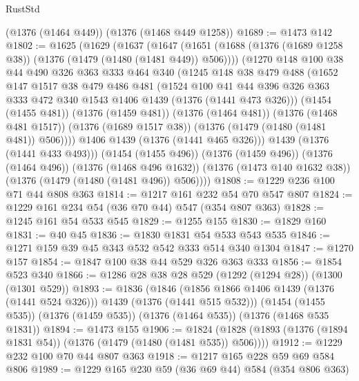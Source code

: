 \begin{lexlean}{RustStd}
\begin{coremodule}
    (@1376 (@1464 @449))
    (@1376 (@1468 @449 @1258))
@1689 := @1473 @142
@1802 := @1625
    (@1629
      (@1637
        (@1647
          (@1651 (@1688 (@1376 (@1689 @1258 @38)) (@1376 (@1479 (@1480 (@1481 @449)) @506))))
          (@1270
            @148
            @100
            @38
            @44
            @490
            @326
            @363
            @333
            @464
            @340
            (@1245
              @148
              @38
              @479
              @488
              (@1652
                @147
                @1517
                @38
                @479
                @486
                @481
                (@1524
                  @100
                  @41
                  @44
                  @396
                  @326
                  @363
                  @333
                  @472
                  @340
                  @1543
                  @1406
                  @1439
                  (@1376 (@1441 @473 @326)))
                (@1454 (@1455 @481))
                (@1376 (@1459 @481))
                (@1376 (@1464 @481))
                (@1376 (@1468 @481 @1517))
                (@1376 (@1689 @1517 @38))
                (@1376 (@1479 (@1480 (@1481 @481)) @506))))
            @1406
            @1439
            (@1376 (@1441 @465 @326)))
          @1439
          (@1376 (@1441 @433 @493)))
        (@1454 (@1455 @496))
        (@1376 (@1459 @496))
        (@1376 (@1464 @496))
        (@1376 (@1468 @496 @1632))
        (@1376 (@1473 @140 @1632 @38))
        (@1376 (@1479 (@1480 (@1481 @496)) @506))))
@1808 := @1229 @236 @100 @71 @44 @808 @363
@1814 := @1217 @161 @232 @54 @70 @547 @807
@1824 := @1229 @161 @234 @54 (@36 @70 @44) @547 (@354 @807 @363)
@1828 := @1245 @161 @54 @533 @545
@1829 := @1255 @155
@1830 := @1829 @160
@1831 := @40 @45
@1836 := @1830 @1831 @54 @533 @543 @535
@1846 := @1271 @159 @39 @45 @343 @532 @542 @333 @514 @340 @1304
@1847 := @1270 @157
@1854 := @1847 @100 @38 @44 @529 @326 @363 @333
@1856 := @1854 @523 @340
@1866 := @1286 @28 @38 @28 @529 (@1292 (@1294 @28)) (@1300 (@1301 @529))
@1893 := @1836
    (@1846 (@1856 @1866 @1406 @1439 (@1376 (@1441 @524 @326))) @1439 (@1376 (@1441 @515 @532)))
    (@1454 (@1455 @535))
    (@1376 (@1459 @535))
    (@1376 (@1464 @535))
    (@1376 (@1468 @535 @1831))
@1894 := @1473 @155
@1906 := @1824 (@1828 (@1893 (@1376 (@1894 @1831 @54)) (@1376 (@1479 (@1480 (@1481 @535)) @506))))
@1912 := @1229 @232 @100 @70 @44 @807 @363
@1918 := @1217 @165 @228 @59 @69 @584 @806
@1989 := @1229
    @165
    @230
    @59
    (@36 @69 @44)
    @584
    (@354 @806 @363)

\end{coremodule}
\end{lexlean}
